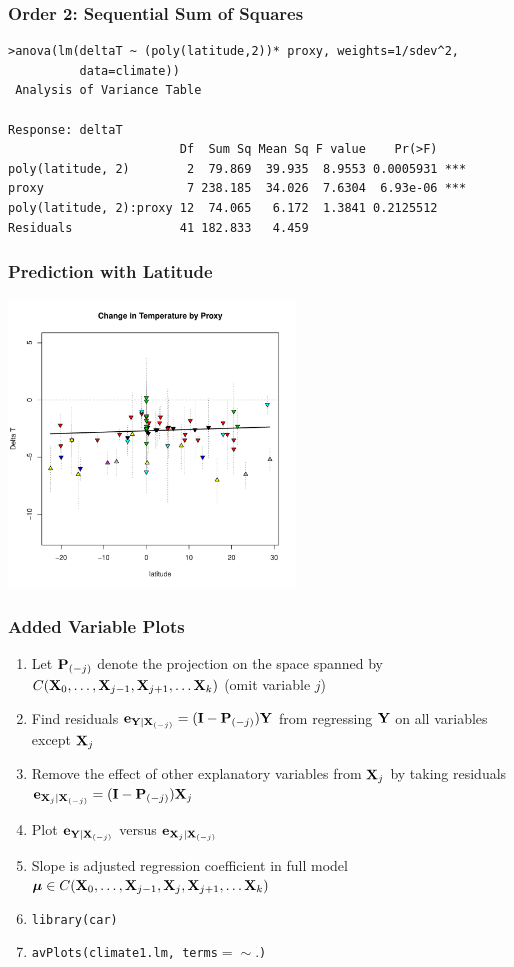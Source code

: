 \documentclass[]{beamer}
\begin{document}
\begin{frame}[fragile]
 \frametitle{Order 2: Sequential Sum of Squares}
   \begin{small}
\begin{verbatim}
>anova(lm(deltaT ~ (poly(latitude,2))* proxy, weights=1/sdev^2,
          data=climate))
 Analysis of Variance Table

Response: deltaT
                        Df  Sum Sq Mean Sq F value    Pr(>F)    
poly(latitude, 2)        2  79.869  39.935  8.9553 0.0005931 ***
proxy                    7 238.185  34.026  7.6304  6.93e-06 ***
poly(latitude, 2):proxy 12  74.065   6.172  1.3841 0.2125512    
Residuals               41 182.833   4.459                      
\end{verbatim}
\end{small}
\end{frame}
\begin{frame}
  \frametitle{Prediction with Latitude}
  \centerline{\includegraphics[height=3in]{pred-temp-lat}}
\end{frame}
\begin{frame}
  \frametitle{Added Variable Plots}
  \begin{enumerate}
  \item   Let $\P_{(-j)}$ denote the projection on the space spanned by
   $C(\X_0, \ldots, \X_{j-1}, \X_{j+1}, \ldots \X_k)$  (omit variable
    $j$) \pause
\item  Find residuals $\e_{\Y \mid \X_{(-j)}} = (\I - \P_{(-j)})\Y$
  from regressing $\Y$ on  all variables except $\X_j$ \pause
\item  Remove the effect of other explanatory variables from $\X_j$ by
  taking residuals $ \e_{\X_j \mid \X_{(-j)}} = (\I - \P_{(-j)})\X_j$ \pause
\item Plot $\e_{\Y \mid \X_{(-j)}}$ versus $\e_{\X_j \mid \X_{(-j)}}$ \pause
\item Slope is adjusted regression coefficient in full model $\mub \in
  C(\X_0, \ldots, \X_{j-1}, \X_j, \X_{j+1}, \ldots \X_k)$ \pause
\item {\tt library(car)} \pause
\item {\tt avPlots(climate1.lm, terms$=\sim .$)}
  \end{enumerate}
 \end{frame}
\end{document}
